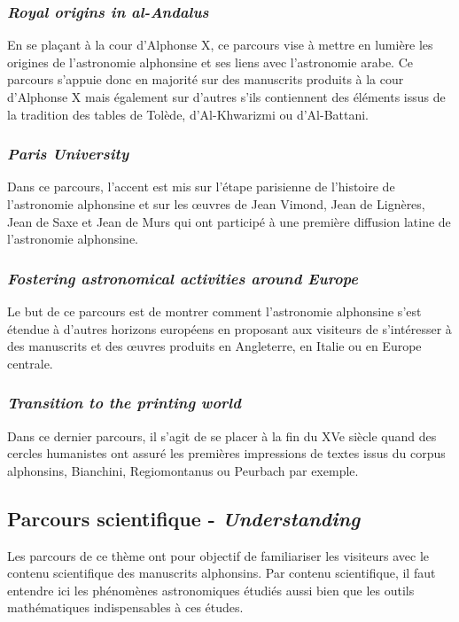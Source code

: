 	\subsubsection{\textit{Royal origins in al-Andalus}}
	En se plaçant à la cour d'Alphonse X, ce parcours vise à mettre en lumière les origines de l'astronomie alphonsine et ses liens avec l'astronomie arabe. Ce parcours s'appuie donc en majorité sur des manuscrits produits à la cour d'Alphonse X mais également sur d'autres s'ils contiennent des éléments issus de la tradition des tables de Tolède, d’Al-Khwarizmi ou d’Al-Battani.

	\subsubsection{\textit{Paris University}}
	Dans ce parcours, l'accent est mis sur l'étape parisienne de l'histoire de l'astronomie alphonsine et sur les œuvres de Jean Vimond, Jean de Lignères, Jean de Saxe et Jean de Murs qui ont participé à une première diffusion latine de l’astronomie alphonsine.
	
	\subsubsection{\textit{Fostering astronomical activities around Europe}}
	Le but de ce parcours est de montrer comment l'astronomie alphonsine s'est étendue à d'autres horizons européens en proposant aux visiteurs de s'intéresser à des manuscrits et des œuvres produits en Angleterre, en Italie ou en Europe centrale.  
	
	\subsubsection{\textit{Transition to the printing world}}
	Dans ce dernier parcours, il s'agit de se placer à la fin du XVe siècle quand des cercles humanistes ont assuré les premières impressions de textes issus du corpus alphonsins, Bianchini, Regiomontanus ou Peurbach par exemple.
	
	\subsection{Parcours scientifique - \textit{Understanding}}
	Les parcours de ce thème ont pour objectif de familiariser les visiteurs avec le contenu scientifique des manuscrits alphonsins. Par contenu scientifique, il faut entendre ici les phénomènes astronomiques étudiés aussi bien que les outils mathématiques indispensables à ces études. 
	
